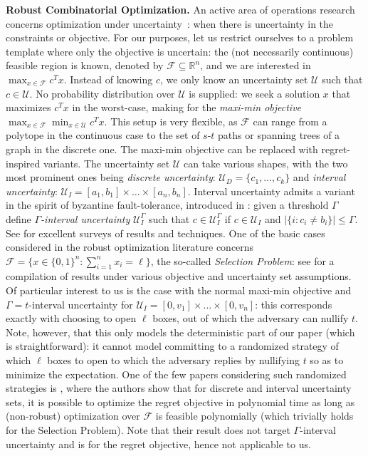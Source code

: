 \noindent \textbf{Robust Combinatorial Optimization.} An active area of operations research concerns optimization under uncertainty~\cite{bertsimas2022robust}: when there is uncertainty in the constraints or objective. 
For our purposes, let us restrict ourselves to a problem template where only the objective is uncertain: the (not necessarily continuous) feasible region is known, denoted by $\mathcal{F} \subseteq \mathbb{R}^n$, and we are interested in $\max_{x \in \mathcal{F}} c^T x$. Instead of knowing $c$, we only know an uncertainty set $\mathcal{U}$ such that $c \in \mathcal{U}$. No probability distribution over $\mathcal{U}$ is supplied: we seek a solution $x$ that maximizes $c^T x$ in the worst-case, making for the \emph{maxi-min objective} $\max_{x \in \mathcal{F}} \min_{x \in \mathcal{U}} c^T x$. This setup is very flexible, as $\mathcal{F}$ can range from a polytope in the continuous case to the set of $s$-$t$ paths or spanning trees of a graph in the discrete one. The maxi-min objective can be replaced with regret-inspired variants. The uncertainty set $\mathcal{U}$ can take various shapes, with the two most prominent ones being \emph{discrete uncertainty}: $\mathcal{U}_D = \{c_1, \dots, c_k\}$ and \emph{interval uncertainty}: $\mathcal{U}_I = [a_1, b_1] \times \dots \times [a_n, b_n]$. Interval uncertainty admits a variant in the spirit of byzantine fault-tolerance, introduced in \cite{threshold_adversary_is_defined}: given a threshold $\Gamma$ define \emph{$\Gamma$-interval uncertainty} $\mathcal{U}_I^\Gamma$ such that $c \in \mathcal{U}_I^\Gamma$ if $c \in \mathcal{U}_I$ and $|\{i : c_i \neq b_i\}| \leq \Gamma$. See \cite{robust_survey1, robust_survey2, robust_survey3_algorithmic_design, robust_survey4, robust_survey5_practical} for excellent surveys of results and techniques. One of the basic cases considered in the robust optimization literature concerns $\mathcal{F} = \{x \in \{0, 1\}^n : \sum_{i = 1}^n x_i = \ell\}$, the so-called \emph{Selection Problem}: see \cite{robust_survey2} for a compilation of results under various objective and uncertainty set assumptions. Of particular interest to us is the case with the normal maxi-min objective and $\Gamma=t$-interval uncertainty for $\mathcal{U}_I = [0, v_1] \times \dots \times [0, v_n]$: this corresponds exactly with choosing to open $\ell$ boxes, out of which the adversary can nullify $t$. Note, however, that this only models the deterministic part of our paper (which is straightforward): it cannot model committing to a randomized strategy of which $\ell$ boxes to open to which the adversary replies by nullifying $t$ so as to minimize the expectation. One of the few papers considering such randomized strategies is \cite{selection_minmax_regret_randomized}, where the authors show that for discrete and interval uncertainty sets, it is possible to optimize the regret objective in polynomial time as long as (non-robust) optimization over $\mathcal{F}$ is feasible polynomially (which trivially holds for the Selection Problem). Note that their result does not target $\Gamma$-interval uncertainty and is for the regret objective, hence not applicable to us. 
